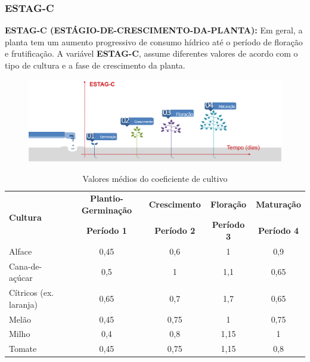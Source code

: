 \subsubsection{ESTAG-C}

\textbf{ESTAG-C (ESTÁGIO-DE-CRESCIMENTO-DA-PLANTA):} Em geral, a planta tem um aumento progressivo de consumo hídrico até o período de floração e frutificação. A variável  \textbf{ESTAG-C}, assume diferentes valores de acordo com o tipo de cultura e a fase de crescimento da planta.

\begin{figure}[h!]
\centering
\includegraphics[width=1\linewidth]{Descricao/Imagens/estagio_de_crescimento}
\caption{}
\label{fig:estagio_de_crescimento}
\end{figure}



\begin{table}[h!]
	
	
	
	\centering
	\caption{Valores médios do coeficiente de cultivo}
	\label{tab:ESTAG-C}
	\begin{tabular}{lcccc}
		\hline \hline
		\multirow{2}{*}{\textbf{Cultura}} & \textbf{Plantio-Germinação} & \textbf{Crescimento} & \textbf{Floração}  & \textbf{Maturação} \\
		& \textbf{Período 1}          & \textbf{Período 2}   & \textbf{Período 3} & \textbf{Período 4} \\
		\hline 
		Alface                   & 0,45               & 0,6         & 1         & 0,9       \\
		Cana-de-açúcar           & 0,5                & 1           & 1,1       & 0,65      \\
		Cítricos (ex. laranja)   & 0,65               & 0,7         & 1,7       & 0,65      \\
		Melão                    & 0,45               & 0,75        & 1         & 0,75      \\
		Milho                    & 0,4                & 0,8         & 1,15      & 1         \\
		Tomate                   & 0,45               & 0,75        & 1,15      & 0,8      \\
		\hline
	\end{tabular}
\end{table}



